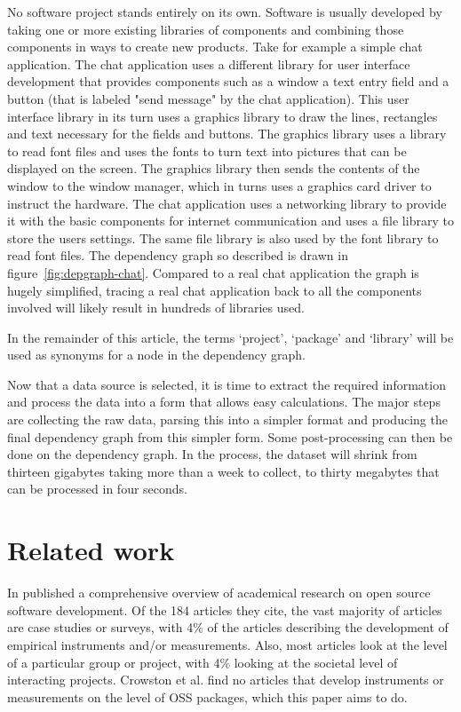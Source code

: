 \documentclass[smallextended,final]{svjour3}
\begin{document}
No software project stands entirely on its own. Software is usually developed by taking one or more existing libraries of components and combining those components in ways to create new products. Take for example a simple chat application. The chat application uses a different library for user interface development that provides components such as a window a text entry field and a button (that is labeled "send message" by the chat application). This user interface library in its turn uses a graphics library to draw the lines, rectangles and text necessary for the fields and buttons. The graphics library uses a library to read font files and uses the fonts to turn text into pictures that can be displayed on the screen. The graphics library then sends the contents of the window to the window manager, which in turns uses a graphics card driver to instruct the hardware. The chat application uses a networking library to provide it with the basic components for internet communication and uses a file library to store the users settings. The same file library is also used by the font library to read font files. The dependency graph so described is drawn in figure~\ref{fig:depgraph-chat}. Compared to a real chat application the graph is hugely simplified, tracing a real chat application back to all the components involved will likely result in hundreds of libraries used.

In the remainder of this article, the terms `project', `package' and `library' will be used as synonyms for a node in the dependency graph.

Now that a data source is selected, it is time to extract the required information and process the data into a form that allows easy calculations. The major steps are collecting the raw data, parsing this into a simpler format and producing the final dependency graph from this simpler form. Some post-processing can then be done on the dependency graph. In the process, the dataset will shrink from thirteen gigabytes taking more than a week to collect, to thirty megabytes that can be processed in four seconds.

\section{Related work}

In \citet{crowston08} published a comprehensive overview of academical research on open source software development. Of the 184 articles they cite, the vast majority of articles are case studies or surveys, with 4\% of the articles describing the development of empirical instruments and/or measurements. Also, most articles look at the level of a particular group or project, with 4\% looking at the societal level of interacting projects. Crowston et al. find no articles that develop instruments or measurements on the level of OSS packages, which this paper aims to do.
\end{document}
